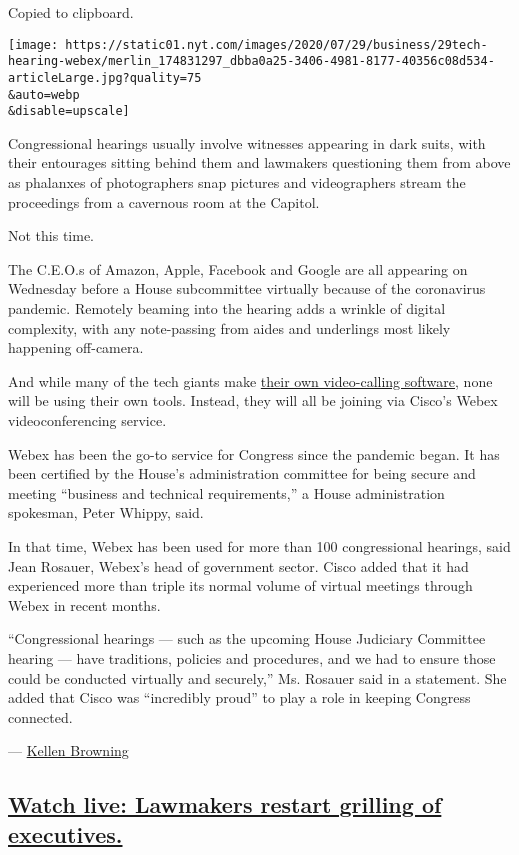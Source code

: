 Copied to clipboard.

\texttt{[image: https://static01.nyt.com/images/2020/07/29/business/29tech-hearing-webex/merlin\_174831297\_dbba0a25-3406-4981-8177-40356c08d534-articleLarge.jpg?quality=75\\\&auto=webp\\\&disable=upscale]}

Congressional hearings usually involve witnesses appearing in dark
suits, with their entourages sitting behind them and lawmakers
questioning them from above as phalanxes of photographers snap pictures
and videographers stream the proceedings from a cavernous room at the
Capitol.

Not this time.

The C.E.O.s of Amazon, Apple, Facebook and Google are all appearing on
Wednesday before a House subcommittee virtually because of the
coronavirus pandemic. Remotely beaming into the hearing adds a wrinkle
of digital complexity, with any note-passing from aides and underlings
most likely happening off-camera.

And while many of the tech giants make
\href{https://www.nytimes.com/2020/04/24/technology/zoom-rivals-virus-facebook-google.html}{their
own video-calling software}, none will be using their own tools.
Instead, they will all be joining via Cisco's Webex videoconferencing
service.

Webex has been the go-to service for Congress since the pandemic began.
It has been certified by the House's administration committee for being
secure and meeting ``business and technical requirements,'' a House
administration spokesman, Peter Whippy, said.

In that time, Webex has been used for more than 100 congressional
hearings, said Jean Rosauer, Webex's head of government sector. Cisco
added that it had experienced more than triple its normal volume of
virtual meetings through Webex in recent months.

``Congressional hearings --- such as the upcoming House Judiciary
Committee hearing --- have traditions, policies and procedures, and we
had to ensure those could be conducted virtually and securely,'' Ms.
Rosauer said in a statement. She added that Cisco was ``incredibly
proud'' to play a role in keeping Congress connected.

--- \href{https://www.nytimes.com/by/kellen-browning}{Kellen Browning}

\hypertarget{watch-live-lawmakers-restart-grilling-of-executives}{%
\subsection{\texorpdfstring{\protect\hyperlink{watch-live-lawmakers-restart-grilling-of-executives}{Watch
live: Lawmakers restart grilling of
executives.}}{Watch live: Lawmakers restart grilling of executives.}}\label{watch-live-lawmakers-restart-grilling-of-executives}}

